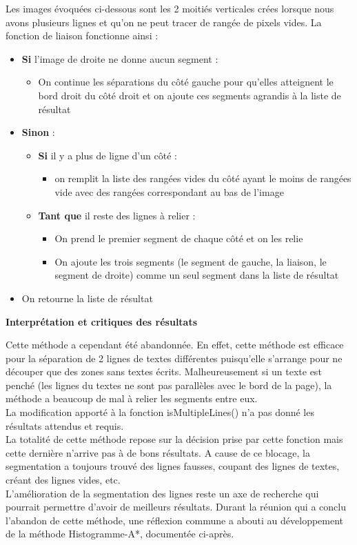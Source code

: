 \documentclass[12pt,a4paper]{article}
\begin{document}
\bigbreak
Les images évoquées ci-dessous sont les 2 moitiés verticales crées lorsque nous avons plusieurs lignes et qu’on ne peut tracer de rangée de pixels vides. La fonction de liaison fonctionne ainsi :
\bigbreak
\begin{itemize}
    \item \textbf{Si} l’image de droite ne donne aucun segment :
    \begin{itemize}
        \item On continue les séparations du côté gauche pour qu’elles atteignent le bord droit du côté droit et on ajoute ces segments agrandis à la liste de résultat
    \end{itemize}
    \item \textbf{Sinon} :
    \begin{itemize}
        \item \textbf{Si} il y a plus de ligne d’un côté :
        \begin{itemize}
            \item on remplit la liste des rangées vides du côté ayant le moins de rangées vide avec des rangées correspondant au bas de l’image
        \end{itemize}
        \item \textbf{Tant que} il reste des lignes à relier :
        \begin{itemize}
            \item On prend le premier segment de chaque côté et on les relie
            \item On ajoute les trois segments (le segment de gauche, la liaison, le segment de droite) comme un seul segment dans la liste de résultat
        \end{itemize}
    \end{itemize}
    \item On retourne la liste de résultat
\end{itemize}
\bigbreak

\bigbreak\textbf{Interprétation et critiques des résultats}\bigbreak

Cette méthode a cependant été abandonnée.\bigbreak
En effet, cette méthode est efficace pour la séparation de 2 lignes de textes différentes puisqu'elle s'arrange pour ne découper que des zones sans textes écrits. Malheureusement si un texte est penché (les lignes du textes ne sont pas parallèles avec le bord de la page), la méthode a beaucoup de mal à relier les segments entre eux.\\
La modification apporté à la fonction isMultipleLines() n’a pas donné les résultats attendus et requis.\\
La totalité de cette méthode repose sur la décision prise par cette fonction mais cette dernière n'arrive pas à de bons résultats.\bigbreak
A cause de ce blocage, la segmentation a toujours trouvé des lignes fausses, coupant des lignes de textes, créant des lignes vides, etc.\\
L’amélioration de la segmentation des lignes reste un axe de recherche qui pourrait permettre d'avoir de meilleurs résultats.
Durant la réunion qui a conclu l’abandon de cette méthode, une réflexion commune a abouti au développement de la méthode Histogramme-A*, documentée ci-après.\bigbreak
\end{document}
